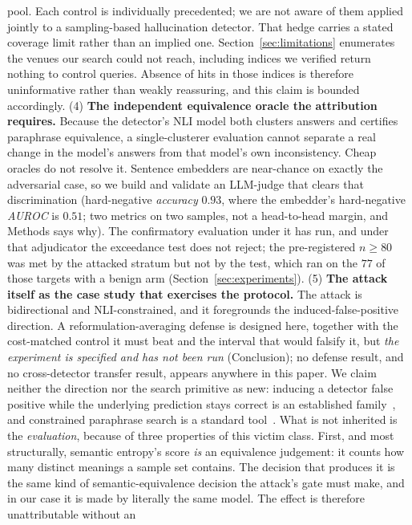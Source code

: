 pool. Each control is individually
precedented; we are not aware of them applied jointly to a sampling-based hallucination
detector. That hedge carries a stated coverage limit rather than an implied one.
Section~\ref{sec:limitations} enumerates the venues our search could not reach, including
indices we verified return nothing to control queries. Absence of hits in those indices is
therefore uninformative rather than weakly reassuring, and this claim is bounded accordingly.
(4) \textbf{The independent equivalence oracle the attribution requires.} Because the
detector's NLI model both clusters answers and certifies paraphrase equivalence, a
single-clusterer evaluation cannot separate a real change in the model's answers from that
model's own inconsistency. Cheap oracles do not resolve it. Sentence embedders are
near-chance on exactly the adversarial case, so we build and validate an LLM-judge that
clears that discrimination (hard-negative \emph{accuracy} $0.93$, where the embedder's
hard-negative \emph{AUROC} is $0.51$; two metrics on two samples, not a head-to-head
margin, and Methods says why). The confirmatory evaluation under it has
run, and under that adjudicator the exceedance test does not reject; the pre-registered
$n{\geq}80$ was met by the attacked stratum but not by the test, which ran on the $77$ of
those targets with a benign arm (Section~\ref{sec:experiments}).
(5) \textbf{The attack itself as the case study that exercises the protocol.} The
attack is bidirectional and NLI-constrained, and it foregrounds the induced-false-positive
direction. A reformulation-averaging defense is designed here, together with the
cost-matched control it must beat and the interval that would falsify it, but \emph{the
experiment is specified and has not been run} (Conclusion); no defense result, and no
cross-detector transfer result, appears anywhere in this paper. We
claim neither the direction nor the search primitive as new: inducing a detector false
positive while the underlying prediction stays correct is an established
family~\citep{rusert2025redherring, khanmohammadi2026answerpreserving}, and constrained
paraphrase search is a standard tool~\citep{liang2025seca, liang2026realista}. What is not
inherited is the \emph{evaluation}, because of three properties of this victim class. First,
and most structurally, semantic entropy's score \emph{is} an equivalence judgement: it
counts how many distinct meanings a sample set contains. The decision that produces it is
the same kind of semantic-equivalence decision the attack's gate must make, and in our case
it is made by literally the same model. The effect is therefore unattributable without an
